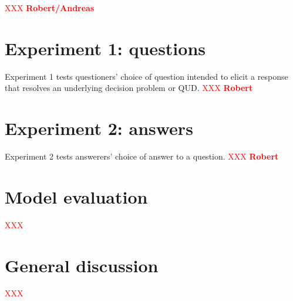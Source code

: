 \documentclass[10pt,letterpaper]{article}
\newcommand{\red}[1]{\textcolor{Red}{#1}}
\begin{document}
\red{XXX \textbf{Robert/Andreas}}

\section{Experiment 1: questions}
\label{sec:expq}

Experiment 1 tests questioners' choice of question intended to elicit a response that resolves an underlying decision problem or QUD. \red{XXX \textbf{Robert}}

\section{Experiment 2: answers}
\label{sec:expa}

Experiment 2 tests answerers' choice of answer to a question. \red{XXX \textbf{Robert}}

\section{Model evaluation}
\label{sec:evaluation}

\red{XXX}


\section{General discussion}
\label{sec:gd}

\red{XXX}



\setlength{\bibleftmargin}{.125in}
\setlength{\bibindent}{-\bibleftmargin}


\end{document}
